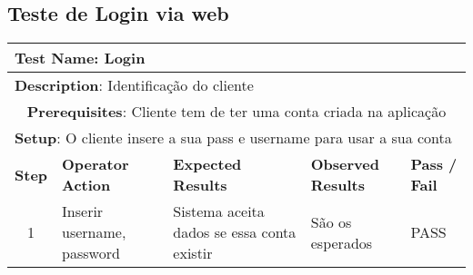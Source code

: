 \documentclass[12pt]{article} %
\begin{document}
\subsection{Teste de Login via web}
\begin{table}[ht!]
	\begin{tabular}{|c|p{4cm}|p{4cm}|p{3cm}|p{1cm}|}
		\hline
		\multicolumn{5}{|l|}{\textbf{Test Name}: Login}\\
		\hline
		\multicolumn{5}{|l|}{\textbf{Description}: Identificação do cliente}\\
		\hline
		\multicolumn{5}{|p{14,5cm}|}{\textbf{Prerequisites}: Cliente tem de ter uma conta criada na aplicação}\\
		\hline
		\multicolumn{5}{|l|}{\textbf{Setup}: O cliente insere a sua pass e username para usar a sua conta}\\
		\hline
		\textbf{Step} & \textbf{Operator Action} & \textbf{Expected Results} & \textbf{Observed Results} & \textbf{Pass / Fail}\\
		\hline
		1 & Inserir username, password & Sistema aceita dados se essa conta existir & São os esperados & PASS\\
		\hline
	\end{tabular}
\end{table}
\pagebreak

\end{document}
